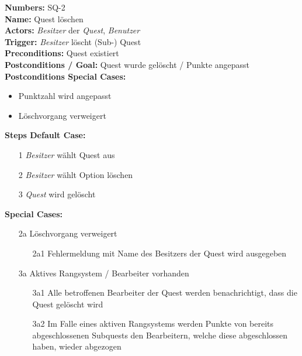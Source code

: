 \documentclass{article}
\begin{document}
\begin{samepage}
	\textbf{Numbers:} SQ-2\\
	\textbf{Name:} Quest löschen\\
	\textbf{Actors:} \textit{Besitzer} der \textit{Quest}, \textit{Benutzer}\\
	\textbf{Trigger:} \textit{Besitzer} löscht (Sub-) Quest\\ 
	\textbf{Preconditions:} Quest existiert \\ 
	\textbf{Postconditions / Goal:} Quest wurde gelöscht / Punkte angepasst\\
	\textbf{Postconditions Special Cases:} 
	\begin{itemize}
		\item Punktzahl wird angepasst 
		\item Löschvorgang verweigert
	\end{itemize}
	\textbf{Steps Default Case:}
	\begin{itemize}
		\item[1] \textit{Besitzer} wählt Quest aus
		\item[2] \textit{Besitzer} wählt Option löschen
		\item[3] \textit{Quest} wird gelöscht 
	\end{itemize}
	\textbf{Special Cases:}
	\begin{itemize}
	\item [2a] Löschvorgang verweigert
	\begin{itemize}
		\item [2a1] Fehlermeldung mit Name des Besitzers der Quest wird ausgegeben 
	\end{itemize} 
	\item [3a] Aktives Rangsystem / Bearbeiter vorhanden
	\begin{itemize}
		\item [3a1] Alle betroffenen Bearbeiter der Quest werden benachrichtigt, dass die Quest gelöscht wird
		\item [3a2] Im Falle eines aktiven Rangsystems werden Punkte von bereits abgeschlossenen Subquests den Bearbeitern, welche diese abgeschlossen haben, wieder abgezogen
	\end{itemize}
	\end{itemize}
	\end{samepage}

\newpage
\end{document}
